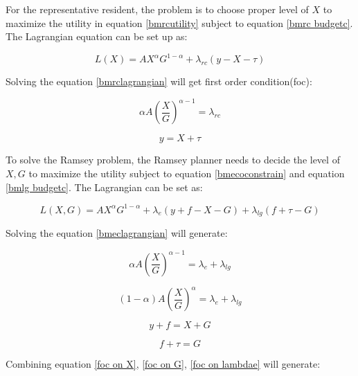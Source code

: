 For the representative resident, the problem is to choose proper level of $X$ to maximize the utility in equation \ref{bmrcutility} subject to equation \ref{bmrc budgetc}. The Lagrangian equation can be set up as:

\begin{equation}
    L(X)=AX^{\alpha}G^{1-\alpha}+\lambda_{rc}(y-X-\tau)  \label{bmrclagrangian}
\end{equation}

Solving the equation \ref{bmrclagrangian} will get first order condition(foc):

\begin{equation}
    \alpha A\left(\frac{X}{G}\right)^{\alpha-1}=\lambda_{r c} \label{lamdarc}
\end{equation}

\begin{equation}
    y=X+\tau \label{rcfoc}
\end{equation}

To solve the Ramsey problem, the Ramsey planner needs to decide the level of $X,G$ to maximize the utility subject to equation \ref{bmecoconstrain} and equation \ref{bmlg budgetc}. The Lagrangian can be set as:

\begin{equation}
    L(X,G)=AX^{\alpha}G^{1-\alpha}+\lambda_{e}(y+f-X-G)+\lambda_{lg}(f+\tau-G)  \label{bmeclagrangian}
\end{equation}

Solving the equation \ref{bmeclagrangian} will generate:

\begin{equation}
    \alpha A\left(\frac{X}{G}\right)^{\alpha-1}=\lambda_e+\lambda_{l g}
    \label{foc on X}
\end{equation}

\begin{equation}
    (1- \alpha) A\left(\frac{X}{G}\right)^{\alpha}=\lambda_e+\lambda_{l g} \label{foc on G}
\end{equation}

\begin{equation}
    y+f=X+G \label{foc on lambdae}
\end{equation}

\begin{equation}
    f+\tau=G \label{foc on lambdalg}
\end{equation}

Combining equation \ref{foc on X}, \ref{foc on G}, \ref{foc on lambdae} will generate:


